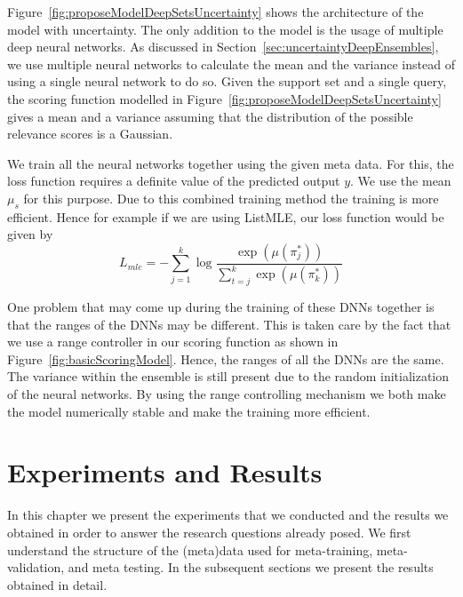 \documentclass[12pt, twoside, ngerman]{report}
\begin{document}
Figure~\ref{fig:proposeModelDeepSetsUncertainty} shows the architecture of the model with uncertainty.
The only addition to the model is the usage of multiple deep neural networks.
As discussed in Section~\ref{sec:uncertaintyDeepEnsembles},  we use multiple neural networks to calculate the mean and the variance instead of using a single neural network to do so.
Given the support set and a single query,  the scoring function modelled in Figure~\ref{fig:proposeModelDeepSetsUncertainty}  gives a mean and a variance assuming that the distribution of the possible relevance scores is a Gaussian.

We train all the neural networks together using the given meta data.
For this,  the loss function requires a definite value of the predicted output $y$.
We use the mean $\mu_s$ for this purpose.
Due to this combined training method the training is more efficient.
Hence for example if we are using ListMLE,  our loss function would be given by
\begin{equation}\label{eq:overflowissue}
L_{mle} = -  \sum\limits_{j=1}^{k} \log \frac{\exp(\mu(\pi^*_j))}{ \sum\limits_{t=j}^k \exp(\mu(\pi^*_k))}
\end{equation}

One problem that may come up during the training of these DNNs together is that the ranges of the DNNs may be different.
This is taken care by the fact that we use a range controller in our scoring function as shown in Figure~\ref{fig:basicScoringModel}.
Hence, the ranges of all the DNNs are the same. 
The variance within the ensemble is still present due to the random initialization of the neural networks.
By using the range controlling mechanism we both make the model numerically stable and make the training more efficient.

\chapter{Experiments and Results}

In this chapter we present the experiments that we conducted and the results we obtained in order to answer the research questions already posed.
We first understand the structure of the (meta)data used for meta-training,  meta-validation,  and meta testing.
In the subsequent sections we present the results obtained in detail.
\end{document}
